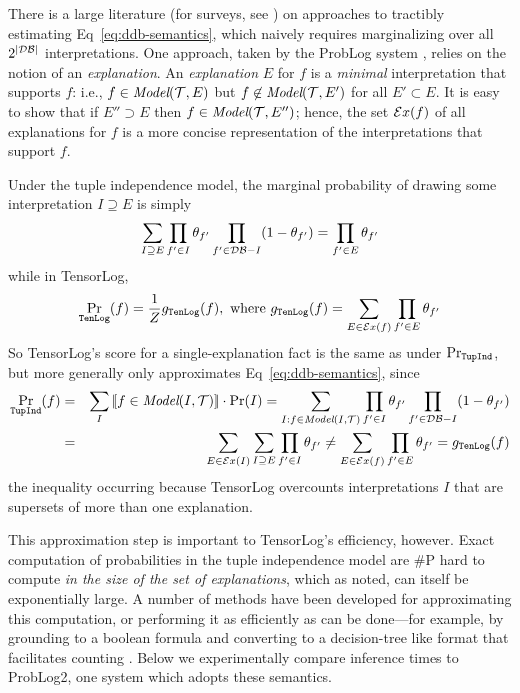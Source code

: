 \documentclass{article}
\newcommand{\cd}[1]{{\small \texttt{#1}}}
\newif\iflong
\newcommand{\longonly}[1]{\iflong{#1}\fi}
\newcommand{\trm}[1]{\textit{#1}}
\newcommand{\exs}{{\cal E}x}
\newcommand{\model}{\textit{Model}}
\newcommand{\T}{{\cal{T}}}
\newcommand{\DB}{{\cal{DB}}}
\newcommand{\indicate}[1]{|\![{#1}]\!|}
\begin{document}
There is a large literature (for surveys, see
\cite{suciu2011probabilistic,de2008probabilistic}) on approaches to
tractibly estimating Eq~\ref{eq:ddb-semantics}, which naively requires
marginalizing over all $2^{|\DB|}$ interpretations.  One approach, taken
by the ProbLog system \cite{fierens2016}, relies on the notion of an
\trm{explanation}.  An \trm{explanation} $E$ for $f$ is a
\emph{minimal} interpretation that supports $f$: i.e.,
$f\in{}\model(\T,E)$ but $f\not\in{}\model(\T,E')$ for all
$E'\subset{}E$.  It is easy to show that if $E'' \supset{} E$ then
$f\in{}\model(\T,E'')$; hence, the set $\exs(f)$ of all explanations
for $f$ is a more concise representation of the interpretations that
support $f$.  \longonly{Some sample explanations are shown in
  Table~\ref{tab:queries}.}

Under the tuple independence model\longonly{ of
  Eq~\ref{eq:tuple-indep}}, the marginal probability of drawing some
interpretation $I\supseteq{}E$ is simply
\[ \sum_{I \supseteq E} \prod_{f'\in{}I} \theta_{f'} \prod_{f'\in{}\DB-I} (1-\theta_{f'}) = \prod_{f'\in{}E} \theta_{f'}
\]
while in TensorLog, 
\[ \Pr_\cd{TenLog}(f) = \frac{1}{Z} g_\cd{TenLog}(f), \mbox{~where~} g_\cd{TenLog}(f) = \sum_{E\in{}\exs(f)} \prod_{f'\in{}E} \theta_{f'} 
\]
So TensorLog's score for a single-explanation fact is the same as under $\Pr_\cd{TupInd}$, but more generally only
approximates Eq~\ref{eq:ddb-semantics}, since 
\begin{eqnarray*}
 \Pr_\cd{TupInd}(f) & =  & \sum_{I} \indicate{f\in\model(I,\T)} \cdot \Pr(I) = \sum_{I:f\in\model(I,\T)} \prod_{f'\in{}I} \theta_{f'}\prod_{f'\in{}\DB-I} (1-\theta_{f'}) \\
       & = & \sum_{E\in{}\exs(I)} \sum_{I\supseteq E} \prod_{f'\in{}I} \theta_{f'} \not= \sum_{E\in\exs(f)} \prod_{f'\in{}E} \theta_{f'} = g_\cd{TenLog}(f)
\end{eqnarray*}
the inequality occurring because TensorLog overcounts interpretations
$I$ that are supersets of more than one explanation.  

This approximation step is important to TensorLog's efficiency,
however. Exact computation of probabilities in the tuple independence
model are \#P hard to compute \cite{fierens2016} \trm{in
  the size of the set of explanations}, which as noted, can itself be
exponentially large.  A number of methods have been developed for
approximating this computation, or performing it as efficiently as can
be done---for example, by grounding to a boolean formula and
converting to a decision-tree like format that facilitates counting
\cite{suciu2011probabilistic}.  Below we experimentally compare
inference times to ProbLog2, one system which adopts these semantics.
\end{document}
